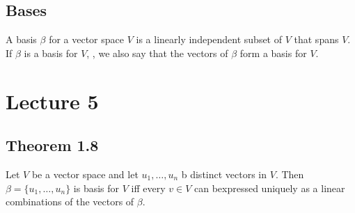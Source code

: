 \documentclass{article}
\begin{document}
\subsection{Bases}
A basis $\beta$ for a vector space $V$ is a linearly independent subset of $V$ that spans $V$. If $\beta$ is a basis for $V$, , we also say that the vectors of $\beta$ form a basis for $V$.\\

\section{Lecture 5}
\subsection{Theorem 1.8}
Let $V$ be a vector space and let $u_1, \dots, u_n$ b distinct vectors in $V$. Then $\beta = \{u_1, \dots, u_n\}$ is basis for $V$ iff every $v \in V$ can bexpressed uniquely as a linear combinations of the vectors of $\beta$.\\
\end{document}

